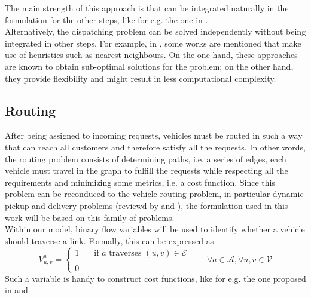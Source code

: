  The main strength of this approach is that can be integrated naturally in the formulation for the other steps, like for e.g. the one in . \\
Alternatively, the dispatching problem can be solved independently without being integrated in other steps. For example, in , some works are mentioned that make use of heuristics such as nearest neighbours. On the one hand, these approaches are known to obtain sub-optimal solutions for the problem; on the other hand, they provide flexibility and might result in less computational complexity. \\


\subsection{Routing}\label{sec:routing}
After being assigned to incoming requests, vehicles must be routed in such a way that can reach all customers and therefore satisfy all the requests. In other words, the routing problem consists of determining paths, i.e. a series of edges, each vehicle must travel in the graph to fulfill the requests while respecting all the requirements and minimizing some metrics, i.e. a cost function. Since this problem can be reconduced to the
vehicle routing problem, in particular dynamic pickup and delivery problems (reviewd by  and ), the formulation used in this work will be based on this family of problems. \\
Within our model, binary flow variables will be used to identify whether a vehicle should traverse a link. Formally, this can be expressed as 
\begin{equation*}
	V_{u,v}^a = 
	\begin{cases} 
		1 & \quad \text{if $a$ traverses } (u,v) \in \mathcal{E}\\
		\\
		0
	\end{cases}
	\quad\quad \forall a \in \mathcal{A}, \forall u,v \in \mathcal{V}
	\label{eq:binary_edges}
\end{equation*}
Such a variable is handy to construct cost functions, like for e.g. the one proposed in  and 

